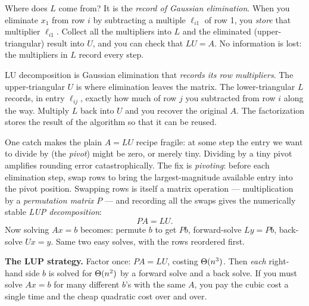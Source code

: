Where does $L$ come from? It is the \emph{record of Gaussian elimination}. When you
eliminate $x_1$ from row $i$ by subtracting a multiple $\ell_{i1}$ of row 1, you
\emph{store} that multiplier $\ell_{i1}$. Collect all the multipliers into $L$ and
the eliminated (upper-triangular) result into $U$, and you can check that $LU=A$.
No information is lost: the multipliers in $L$ record every step.

\begin{intuitionbox}
LU decomposition is Gaussian elimination that \emph{records its row multipliers}. The
upper-triangular $U$ is where elimination leaves the matrix. The lower-triangular
$L$ records, in entry $\ell_{ij}$, exactly how much of row $j$ you subtracted from
row $i$ along the way. Multiply $L$ back into $U$ and
you recover the original $A$. The factorization stores the result of the algorithm
so that it can be reused.
\end{intuitionbox}

One catch makes the plain $A=LU$ recipe fragile: at some step the entry we want to
divide by (the \emph{pivot}) might be zero, or merely tiny. Dividing by a tiny
pivot amplifies rounding error catastrophically. The fix is \emph{pivoting}: before
each elimination step, swap rows to bring the largest-magnitude available entry into
the pivot position. Swapping rows is itself a matrix operation --- multiplication by
a \emph{permutation matrix} $P$ --- and recording all the swaps gives the numerically stable
\emph{LUP decomposition}:
$$
PA=LU.
$$
Now solving $Ax=b$ becomes: permute $b$ to get $Pb$, forward-solve $Ly=Pb$,
back-solve $Ux=y$. Same two easy solves, with the rows reordered first.

\begin{focusbox}
\textbf{The LUP strategy.} Factor once: $PA=LU$, costing
$\Theta(n^3)$. Then \emph{each} right-hand side $b$ is solved for $\Theta(n^2)$ by a
forward solve and a back solve. If you must solve $Ax=b$ for many different $b$'s
with the same $A$, you pay the cubic cost a single time and the cheap quadratic
cost over and over.
\end{focusbox}

